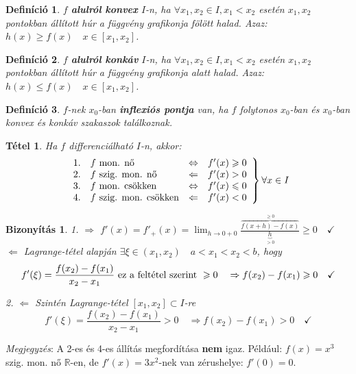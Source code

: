 \documentclass[a4paper,12pt,twoside]{book}
\newtheorem{tetel}{Tétel}[chapter]
\newtheorem{defi}{Definíció}[chapter]
\theoremstyle{break}
\newtheorem{bizNL}[biz]{Bizonyítás}
\theoremstyle{plain}
\begin{document}
\begin{defi}
 $f$ \textbf{alulról konvex} $I$-n, ha $\forall x_1, x_2\in I, x_1<x_2$ esetén $x_1,x_2$ pontokban állított húr a függvény grafikonja fölött halad. Azaz: $h(x) \geqslant f(x) \quad x\in[x_1, x_2]$.
\end{defi}
\begin{defi}
 $f$ \textbf{alulról konkáv} $I$-n, ha $\forall x_1, x_2\in I, x_1<x_2$ esetén $x_1,x_2$ pontokban állított húr a függvény grafikonja alatt halad. Azaz: $h(x) \leqslant f(x) \quad x\in[x_1, x_2]$.
\end{defi}

\begin{defi}
 $f$-nek $x_0$-ban \textbf{inflexiós pontja} van, ha $f$ folytonos $x_0$-ban és $x_0$-ban konvex és konkáv szakaszok találkoznak.
\end{defi}

\begin{tetel} Ha $f$ differenciálható $I$-n, akkor:
 \[\left.\begin{array}{llcc}
 1. & \hbox{$f$ mon. nő} & \Leftrightarrow & f'(x)\geqslant 0 \\
 2. & \hbox{$f$ szig. mon. nő} & \Leftarrow & f'(x)> 0 \\
 3. & \hbox{$f$ mon. csökken} & \Leftrightarrow & f'(x)\leqslant 0 \\
 4. & \hbox{$f$ szig. mon. csökken} & \Leftarrow & f'(x)< 0 \\
         \end{array} \right\} \forall x\in I\]
\end{tetel}
\begin{bizNL}
 1. $\Rightarrow$ $f'(x) = f'_+(x) = \displaystyle \lim_{h\to 0+0} \frac{\overbrace{f(x+h)-f(x)}^{\geqslant 0}}{\underbrace{h}_{>0}} \geqslant 0 \quad \checkmark$\\
 $\Leftarrow$ Lagrange-tétel alapján $\exists\xi\in(x_1,x_2) \quad a< x_1<x_2< b$, hogy
 \[f'(\xi) = \frac{f(x_2)-f(x_1)}{x_2-x_1} \hbox{ ez a feltétel szerint } \geqslant 0 \quad \Rightarrow f(x_2)-f(x_1) \geqslant 0 \quad \checkmark\]

 2. $\Leftarrow$ Szintén Lagrange-tétel $[x_1, x_2]\subset I$-re
 \[f'(\xi) = \frac{f(x_2)-f(x_1)}{x_2-x_1} > 0 \quad \Rightarrow f(x_2)-f(x_1) > 0 \quad \checkmark\]
\end{bizNL}
\emph{Megjegyzés}: A 2-es és 4-es állítás megfordítása \textbf{nem} igaz. Például: $f(x) = x^3$ szig. mon. nő $\mathbb{R}$-en, de $f'(x) = 3x^2$-nek van zérushelye: $f'(0)=0$.
\end{document}
